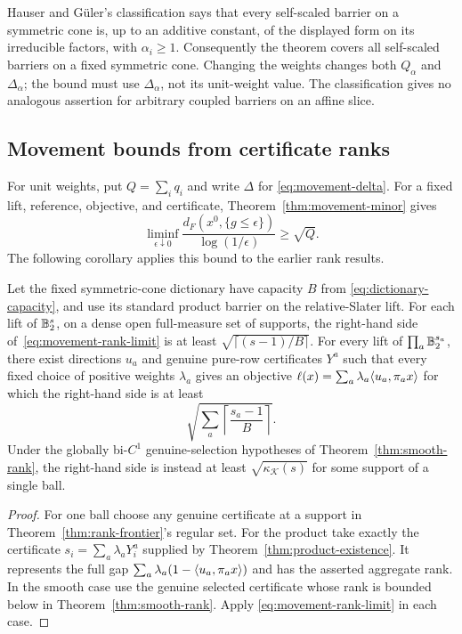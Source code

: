 Hauser and G\"uler's classification
\cite[Theorem~5.5]{HauserGuler2002} says that every self-scaled barrier
on a symmetric cone is, up to an additive constant, of the displayed
form on its irreducible factors, with $\alpha_i\geq1$. Consequently the
theorem covers all self-scaled barriers on a fixed symmetric cone.
Changing the weights changes both $Q_\alpha$ and $\Delta_\alpha$; the
bound must use $\Delta_\alpha$, not its unit-weight value.
The classification gives no analogous assertion for arbitrary coupled
barriers on an affine slice.

\subsection{Movement bounds from certificate ranks}
For unit weights, put $Q=\sum_iq_i$ and write $\Delta$ for
\eqref{eq:movement-delta}. For a fixed lift, reference, objective, and
certificate, Theorem~\ref{thm:movement-minor} gives
\begin{equation}\label{eq:movement-rank-limit}
 \liminf_{\epsilon\downarrow0}
 \frac{d_F(x^0,\{g\leq\epsilon\})}{\log(1/\epsilon)}
 \geq\sqrt Q.
\end{equation}
The following corollary applies this bound to the earlier rank results.
\begin{corollary}\label{cor:movement-dictionary}
Let the fixed symmetric-cone dictionary have capacity $B$ from
\eqref{eq:dictionary-capacity}, and use its standard product barrier on
the relative-Slater lift.
For each lift of $\mathbb B_2^s$, on a dense open full-measure set of supports,
the right-hand side of~\eqref{eq:movement-rank-limit} is at least
$\sqrt{\lceil(s-1)/B\rceil}$.
For every lift of $\prod_a\mathbb B_2^{s_a}$, there exist directions $u_a$
and genuine pure-row certificates $Y^a$ such that every fixed choice
of positive weights $\lambda_a$ gives an objective
$\ell(x)=\sum_a\lambda_a\langle u_a,\pi_a x\rangle$ for which the
right-hand side is at least
\[
 \sqrt{\sum_a\left\lceil\frac{s_a-1}{B}\right\rceil}.
\]
Under the globally bi-$C^1$ genuine-selection hypotheses of
Theorem~\ref{thm:smooth-rank}, the right-hand side is instead at least
$\sqrt{\kappa_{\mathscr K}(s)}$ for some support of a single ball.
\end{corollary}
\begin{proof}
For one ball choose any genuine certificate at a support in
Theorem~\ref{thm:rank-frontier}'s regular set. For the product take
exactly the certificate $s_i=\sum_a\lambda_aY_i^a$ supplied by
Theorem~\ref{thm:product-existence}. It represents the full gap
$\sum_a\lambda_a(1-\langle u_a,\pi_a x\rangle)$ and has the asserted aggregate
rank. In the smooth case use the genuine selected certificate whose
rank is bounded below in Theorem~\ref{thm:smooth-rank}. Apply
\eqref{eq:movement-rank-limit} in each case.
\end{proof}
